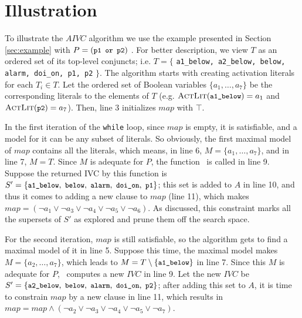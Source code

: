 \section{Illustration}
\label{sec:illust}
To illustrate the $AIVC$ algorithm we use the example presented in Section \ref{sec:example} with $P = (\small{\texttt{p1 or p2}})$ .
For better description, we view $T$ as an ordered set of its top-level conjuncts; i.e. $T = \{$ {\small \texttt{a1\_below, a2\_below, below, alarm, doi\_on, p1, p2}} $\}$.
The algorithm starts with creating activation literals for each $T_i \in T$. Let the ordered set of Boolean variables $\{ a_1, \ldots , a_7 \}$ be the corresponding literals to the elements of $T$ (e.g. $\actlit (\small{\texttt{a1\_below}}) = a_1$ and $\actlit (\small{\texttt{p2}}) = a_7$). Then, line 3 initializes $map$ with $\top$.

In the first iteration of the \texttt{while} loop, since $map$ is empty,
it is satisfiable, and a model for it can
be any subset of literals. So obviously, the first maximal model of $map$ contains all the literals, which means, in line 6, $M = \{a_1, \ldots, a_7\}$,
 and in line 7, $M = T$. Since $M$ is adequate for $P$, 
 the function \getivc ~is called in line 9. 
 Suppose the returned IVC by this function  is 
 $S' = \{ \small{ \texttt{a1\_below},~\texttt{below}, ~\texttt{alarm},
~\texttt{doi\_on},~\texttt{p1}}\}$; 
this set is added to $A$ in line 10, and thus it comes to adding a new clause to $map$ (line 11), which makes $map = (\neg a_1 \vee \neg a_3 \vee \neg a_4 \vee \neg a_5 \vee \neg a_6)$. 
As discussed, this constraint marks all the supersets of $S'$ as explored and prune them off the search space.

For the second iteration, $map$ is still satisfiable, 
so the algorithm gets to find a maximal model of it in line 5. Suppose this time, the maximal model makes $M = \{a_2, \ldots, a_7\}$, 
which leads to $M = T \setminus \{\small{\texttt{a1\_below}}\} $ in line 7. 
Since this $M$ is adequate for $P$, \getivc ~computes a new $IVC$ in line 9. 
Let the new $IVC$ be $S' = \{ \small{ \texttt{a2\_below},~\texttt{below}, ~\texttt{alarm},
~\texttt{doi\_on},~\texttt{p2}}\}$; after adding this set to $A$, 
it is time to constrain $map$ by a new clause in line 11, 
which results in $map = map \wedge (\neg a_2 \vee \neg a_3 \vee \neg a_4 \vee \neg a_5 \vee \neg a_7)$. 

